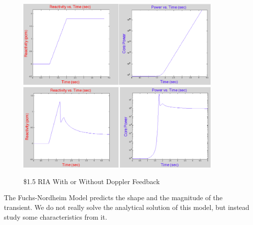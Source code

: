 \documentclass{school-22.211-notes}
\begin{document}
  \begin{figure}[ht]
    \centering
    \includegraphics[width=4in]{images/pke/feedback1.png}
    \\
    \includegraphics[width=4in]{images/pke/feedback2.png}
    \caption{\$1.5 RIA With or Without Doppler Feedback}\label{feedback}
  \end{figure}



\clearpage
{}
The Fuchs-Nordheim Model predicts the shape and the magnitude of the transient. We do not really solve the analytical solution of this model, but instead study some characteristics from it. 
\end{document}
